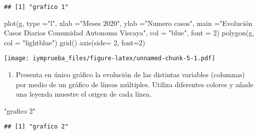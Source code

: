 \documentclass[
  12pt,
]{article}
\newenvironment{Shaded}{\begin{snugshade}}{\end{snugshade}}
\newcommand{\AttributeTok}[1]{\textcolor[rgb]{0.77,0.63,0.00}{#1}}
\newcommand{\DecValTok}[1]{\textcolor[rgb]{0.00,0.00,0.81}{#1}}
\newcommand{\FunctionTok}[1]{\textcolor[rgb]{0.00,0.00,0.00}{#1}}
\newcommand{\NormalTok}[1]{#1}
\newcommand{\StringTok}[1]{\textcolor[rgb]{0.31,0.60,0.02}{#1}}
\providecommand{\tightlist}{%
  \setlength{\itemsep}{0pt}\setlength{\parskip}{0pt}}
\begin{document}
\begin{verbatim}
## [1] "grafico 1"
\end{verbatim}

\begin{Shaded}
\begin{Highlighting}[]
\FunctionTok{plot}\NormalTok{(g, }\AttributeTok{type =}\StringTok{"l"}\NormalTok{, }\AttributeTok{xlab =}\StringTok{"Meses 2020"}\NormalTok{, }\AttributeTok{ylab =}\StringTok{"Numero casos"}\NormalTok{, }\AttributeTok{main =}\StringTok{"Evolución Casos Diarios Comunidad Autonoma Viscaya"}\NormalTok{, }\AttributeTok{col =} \StringTok{"blue"}\NormalTok{, }\AttributeTok{font =} \DecValTok{2}\NormalTok{)}
\FunctionTok{polygon}\NormalTok{(g, }\AttributeTok{col =} \StringTok{"lightblue"}\NormalTok{)}
\FunctionTok{grid}\NormalTok{()}
\FunctionTok{axis}\NormalTok{(}\AttributeTok{side=} \DecValTok{2}\NormalTok{, }\AttributeTok{font=}\DecValTok{2}\NormalTok{)}
\end{Highlighting}
\end{Shaded}

\texttt{[image: iymprueba\_files/figure-latex/unnamed-chunk-5-1.pdf]}

\begin{enumerate}
\def\labelenumi{\alph{enumi})}
\setcounter{enumi}{3}
\tightlist
\item
  Presenta en único gráfico la evolución de las distintas variables
  (columnas) por medio de un gráfico de líneas múltiples. Utiliza
  diferentes colores y añade una leyenda muestre el origen de cada
  línea.
\end{enumerate}

\begin{Shaded}
\begin{Highlighting}[]
\StringTok{"grafico 2"}
\end{Highlighting}
\end{Shaded}

\begin{verbatim}
## [1] "grafico 2"
\end{verbatim}
\end{document}
